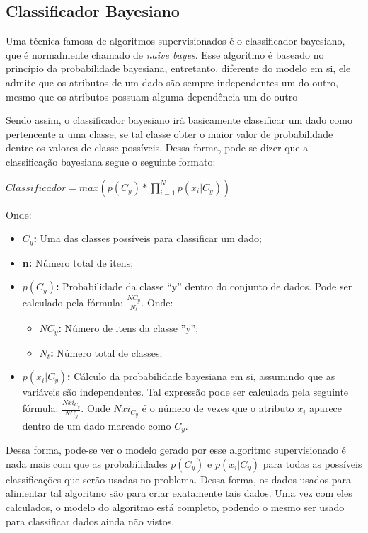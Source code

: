 \subsection{Classificador Bayesiano} \label{sec:classificador_bayesiano}

Uma técnica famosa de algoritmos supervisionados é o classificador bayesiano,
que é normalmente chamado de \textit{naive bayes}. Esse algoritmo é baseado no
princípio da probabilidade bayesiana, entretanto, diferente do modelo em si,
ele admite que os atributos de um dado são sempre independentes um do outro,
mesmo que os atributos possuam alguma dependência um do outro \cite{segaran2007programming}

Sendo assim, o classificador bayesiano irá basicamente classificar um dado
como pertencente a uma classe, se tal classe obter o maior valor de
probabilidade dentre os valores de classe possíveis. Dessa forma, pode-se
dizer que a classificação bayesiana segue o seguinte formato:

$Classificador = max(p(C_{y})*\prod_{i=1}^{N}p(x_{i}|C_{y}))$

Onde:

\begin{itemize}
    \item \textbf{$C_{y}$: } Uma das classes possíveis para classificar um
    dado;
    \item \textbf{n: } Número total de itens;
    \item \textbf{$p(C_{y})$: } Probabilidade da classe ``y'' dentro do
    conjunto de dados. Pode ser calculado pela
    fórmula: $\frac{NC_{y}}{N_{t}}$.
    Onde:
      \begin{itemize}
          \item \textbf{$NC_{y}$: } Número de itens da classe ''y'';
          \item \textbf{$N_{t}$: } Número total de classes;
      \end{itemize}
    \item \textbf{$p(x_{i}|C_{y})$: } Cálculo da probabilidade bayesiana
    em si, assumindo que as variáveis são independentes. Tal expressão
    pode ser calculada pela seguinte fórmula: $\frac{Nxi_{C_{y}}}{NC_{y}}$.
    Onde $Nxi_{C_{y}}$ é o número de vezes que o atributo $x_{i}$ aparece
    dentro de um dado marcado como $C_{y}$.
\end{itemize}

Dessa forma, pode-se ver o modelo gerado por esse algoritmo supervisionado
é nada mais com que as probabilidades $p(C_{y})$ e $p(x_{i}|C_{y})$ para
todas as possíveis classificações que serão usadas no problema. Dessa forma,
os dados usados para alimentar tal algoritmo são para criar exatamente tais
dados. Uma vez com eles calculados, o modelo do algoritmo está completo,
podendo o mesmo ser usado para classificar dados ainda não vistos.

